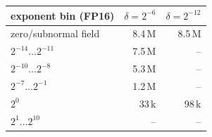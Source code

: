 \begin{tabular}{lrr}
\toprule
exponent bin (FP16) & $\delta=2^{-6}$ & $\delta=2^{-12}$\\
\midrule
zero/subnormal field & 8.4\,M & 8.5\,M\\
$2^{-14}\ldots2^{-11}$ & 7.5\,M & --\\
$2^{-10}\ldots2^{-8}$ & 5.3\,M & --\\
$2^{-7}\ldots2^{-1}$ & 1.2\,M & --\\
$2^{0}$ & 33\,k & 98\,k\\
$2^{1}\ldots2^{10}$ & -- & --\\
\bottomrule
\end{tabular}
